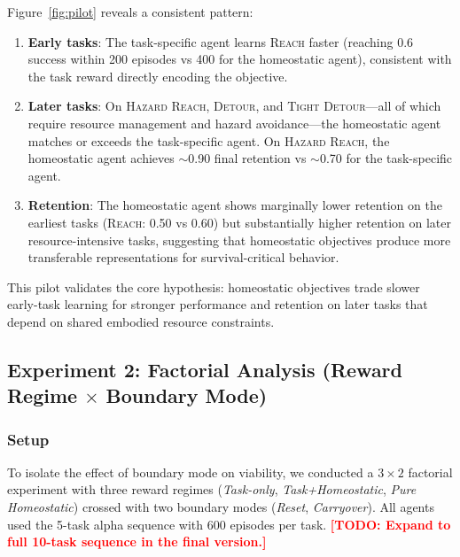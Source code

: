 \documentclass{article}
\newcommand{\todo}[1]{\textcolor{red}{\textbf{[TODO: #1]}}}
\begin{document}
Figure~\ref{fig:pilot} reveals a consistent pattern:

\begin{enumerate}[leftmargin=*,topsep=1pt,itemsep=1pt]
  \item \textbf{Early tasks}: The task-specific agent learns \textsc{Reach}
        faster (reaching 0.6 success within 200 episodes vs 400 for the
        homeostatic agent), consistent with the task reward directly encoding
        the objective.
  \item \textbf{Later tasks}: On \textsc{Hazard Reach}, \textsc{Detour},
        and \textsc{Tight Detour}—all of which require resource management
        and hazard avoidance—the homeostatic agent matches or exceeds the
        task-specific agent. On \textsc{Hazard Reach}, the homeostatic
        agent achieves $\sim$0.90 final retention vs $\sim$0.70 for the
        task-specific agent.
  \item \textbf{Retention}: The homeostatic agent shows marginally lower
        retention on the earliest tasks (\textsc{Reach}: 0.50 vs 0.60)
        but substantially higher retention on later resource-intensive
        tasks, suggesting that homeostatic objectives produce more
        transferable representations for survival-critical behavior.
\end{enumerate}

This pilot validates the core hypothesis: homeostatic objectives trade
slower early-task learning for stronger performance and retention on later
tasks that depend on shared embodied resource constraints.

\subsection{Experiment 2: Factorial Analysis (Reward Regime $\times$ Boundary Mode)}
\label{sec:factorial}

\subsubsection{Setup}

To isolate the effect of boundary mode on viability, we conducted a
$3 \times 2$ factorial experiment with three reward regimes (\emph{Task-only},
\emph{Task+Homeostatic}, \emph{Pure Homeostatic}) crossed with two
boundary modes (\emph{Reset}, \emph{Carryover}). All agents used the
5-task alpha sequence with 600 episodes per task.
\todo{Expand to full 10-task sequence in the final version.}
\end{document}
